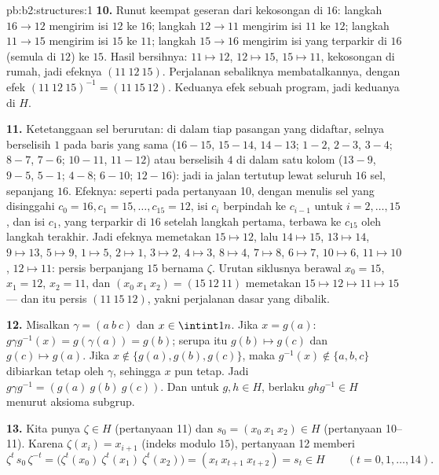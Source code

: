 \begin{solution}{pb:b2:structures:1}
\textbf{10.} Runut keempat geseran dari kekosongan di $16$: langkah
$16 \to 12$ mengirim isi $12$ ke $16$; langkah $12 \to 11$
mengirim isi $11$ ke $12$; langkah $11 \to 15$ mengirim
isi $15$ ke $11$; langkah $15 \to 16$ mengirim isi
yang terparkir di $16$ (semula di $12$) ke $15$. Hasil bersihnya: $11
\mapsto 12$, $12 \mapsto 15$, $15 \mapsto 11$, kekosongan di rumah, jadi
efeknya $(11\ 12\ 15)$. Perjalanan sebaliknya membatalkannya, dengan
efek $(11\ 12\ 15)^{-1} = (11\ 15\ 12)$. Keduanya efek sebuah program,
jadi keduanya di $H$.

\textbf{11.} Ketetanggaan sel berurutan: di dalam tiap pasangan yang
didaftar, selnya berselisih $1$ pada baris yang sama ($16{-}15$,
$15{-}14$, $14{-}13$; $1{-}2$, $2{-}3$, $3{-}4$; $8{-}7$,
$7{-}6$; $10{-}11$, $11{-}12$) atau berselisih $4$ di dalam satu kolom
($13{-}9$, $9{-}5$, $5{-}1$; $4{-}8$; $6{-}10$; $12{-}16$): jadi ia
jalan tertutup lewat seluruh $16$ sel, sepanjang $16$. Efeknya: seperti
pada pertanyaan 10, dengan menulis sel yang disinggahi $c_0 = 16, c_1 = 15,
\dots, c_{15} = 12$, isi $c_i$ berpindah ke $c_{i-1}$ untuk
$i = 2, \dots, 15$, dan isi $c_1$, yang terparkir di $16$
setelah langkah pertama, terbawa ke $c_{15}$ oleh langkah terakhir.
Jadi efeknya memetakan $15 \mapsto 12$, lalu $14 \mapsto 15$, $13
\mapsto 14$, $9 \mapsto 13$, $5 \mapsto 9$, $1 \mapsto 5$, $2
\mapsto 1$, $3 \mapsto 2$, $4 \mapsto 3$, $8 \mapsto 4$, $7
\mapsto 8$, $6 \mapsto 7$, $10 \mapsto 6$, $11 \mapsto 10$, $12
\mapsto 11$: persis  berpanjang $15$ bernama $\zeta$. Urutan siklusnya
berawal $x_0 = 15$, $x_1 = 12$, $x_2 = 11$, dan $(x_0\ x_1\ x_2)
= (15\ 12\ 11)$ memetakan $15 \mapsto 12 \mapsto 11 \mapsto 15$ ---
dan itu persis $(11\ 15\ 12)$, yakni perjalanan dasar yang dibalik.

\textbf{12.} Misalkan $\gamma = (a\ b\ c)$ dan $x \in \intint1n$. Jika
$x = g(a)$: $g\gamma g^{-1}(x) = g(\gamma(a)) = g(b)$; serupa itu
$g(b) \mapsto g(c)$ dan $g(c) \mapsto g(a)$. Jika $x \notin
\{g(a), g(b), g(c)\}$, maka $g^{-1}(x) \notin \{a,b,c\}$ dibiarkan
tetap oleh $\gamma$, sehingga $x$ pun tetap. Jadi $g\gamma g^{-1} =
(g(a)\ g(b)\ g(c))$. Dan untuk $g, h \in H$, berlaku $ghg^{-1} \in H$
menurut aksioma subgrup.

\textbf{13.} Kita punya $\zeta \in H$ (pertanyaan 11) dan $s_0 = (x_0\
x_1\ x_2) \in H$ (pertanyaan 10--11). Karena $\zeta(x_i) = x_{i+1}$
(indeks modulo $15$), pertanyaan 12 memberi
\[
\zeta^{t}\,s_0\,\zeta^{-t}
= \bigl(\zeta^t(x_0)\ \zeta^t(x_1)\ \zeta^t(x_2)\bigr)
= (x_t\ x_{t+1}\ x_{t+2}) = s_t \in H
\qquad (t = 0, 1, \dots, 14).
\]


\end{solution}
